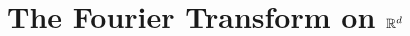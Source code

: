 \documentclass[../../main.tex]{subfiles}
\begin{document}
\chapter{The Fourier Transform on \(\mathbb{R}^d\)}
\end{document}
